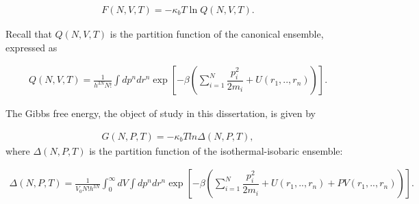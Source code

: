 \documentclass[
	12pt,				%
	openany,			%
	oneside,			%
	a4paper,			%
	english,			%
	brazil				%
	]{abntex2}
\providecommand{\DIFaddbegin}{}
\providecommand{\DIFaddend}{}
\providecommand{\DIFdelbegin}{}
\providecommand{\DIFdelend}{}
\providecommand{\DIFaddbegin}{} %
\providecommand{\DIFaddend}{} %
\providecommand{\DIFdelbegin}{} %
\providecommand{\DIFdelend}{} %
\begin{document}
\begin{equation}
\label{eq:fcano}
\begin{aligned}
F(N,V,T) = -\kappa_{b}T \ln Q(N,V,T).
\end{aligned}
\end{equation}

Recall that $Q(N,V,T)$ is the partition function of the canonical ensemble, expressed as

\begin{equation}
\label{eq:partican}
\DIFdelbegin %
\DIFdelend \DIFaddbegin \begin{aligned}
Q(N,V,T) =\frac{1}{h^{3N}N!} \int dp^{n} dr^{n} \exp \left[ -\beta \left( \sum_{i=1}^{N}\dfrac{p_{i}^{2}}{2m_{i}} + U(r_{1},..,r_{n}) \right)
\right] .
\end{aligned}
\DIFaddend \end{equation}

The Gibbs free energy, the object of study in this dissertation, is given by

\begin{equation}
\begin{aligned}
G(N,P,T) = -\kappa_{b}T ln \Delta (N,P,T),
\end{aligned}
\end{equation}
where $\Delta (N,P,T)$ is the partition function of the isothermal-isobaric ensemble:

\begin{equation}
\DIFdelbegin %
\DIFdelend \DIFaddbegin \begin{aligned}
\Delta (N,P,T) = \frac{1}{V_{0}N!h^{3N}} \int_{0}^{\infty} dV \int dp^{n} dr^{n} \exp \left[ -\beta \left( \sum_{i=1}^{N}\dfrac{p_{i}^{2}}{2m_{i}} + U(r_{1},..,r_{n}) + PV(r_{1},..,r_{n}) \right) \right].
\end{aligned}
\DIFaddend \end{equation}
\end{document}

